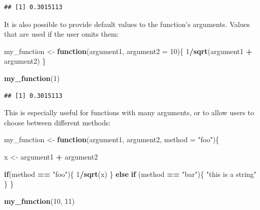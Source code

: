 \documentclass[]{gitbook}
\newenvironment{Shaded}{\begin{snugshade}}{\end{snugshade}}
\newcommand{\ControlFlowTok}[1]{\textcolor[rgb]{0.13,0.29,0.53}{\textbf{#1}}}
\newcommand{\DataTypeTok}[1]{\textcolor[rgb]{0.13,0.29,0.53}{#1}}
\newcommand{\DecValTok}[1]{\textcolor[rgb]{0.00,0.00,0.81}{#1}}
\newcommand{\KeywordTok}[1]{\textcolor[rgb]{0.13,0.29,0.53}{\textbf{#1}}}
\newcommand{\NormalTok}[1]{#1}
\newcommand{\OperatorTok}[1]{\textcolor[rgb]{0.81,0.36,0.00}{\textbf{#1}}}
\newcommand{\StringTok}[1]{\textcolor[rgb]{0.31,0.60,0.02}{#1}}
\begin{document}
\begin{verbatim}
## [1] 0.3015113
\end{verbatim}

It is also possible to provide default values to the function's arguments. Values that are used
if the user omits them:

\begin{Shaded}
\begin{Highlighting}[]
\NormalTok{my_function <-}\StringTok{ }\ControlFlowTok{function}\NormalTok{(argument1, }\DataTypeTok{argument2 =} \DecValTok{10}\NormalTok{)\{}
\DecValTok{1}\OperatorTok{/}\KeywordTok{sqrt}\NormalTok{(argument1 }\OperatorTok{+}\StringTok{ }\NormalTok{argument2)}
\NormalTok{\}}
\end{Highlighting}
\end{Shaded}

\begin{Shaded}
\begin{Highlighting}[]
\KeywordTok{my_function}\NormalTok{(}\DecValTok{1}\NormalTok{)}
\end{Highlighting}
\end{Shaded}

\begin{verbatim}
## [1] 0.3015113
\end{verbatim}

This is especially useful for functions with many arguments, or to allow users to choose between
different methods:

\begin{Shaded}
\begin{Highlighting}[]
\NormalTok{my_function <-}\StringTok{ }\ControlFlowTok{function}\NormalTok{(argument1, argument2, }\DataTypeTok{method =} \StringTok{"foo"}\NormalTok{)\{}
  
\NormalTok{  x <-}\StringTok{ }\NormalTok{argument1 }\OperatorTok{+}\StringTok{ }\NormalTok{argument2}
  
  \ControlFlowTok{if}\NormalTok{(method }\OperatorTok{==}\StringTok{ "foo"}\NormalTok{)\{}
    \DecValTok{1}\OperatorTok{/}\KeywordTok{sqrt}\NormalTok{(x)}
\NormalTok{  \} }\ControlFlowTok{else} \ControlFlowTok{if}\NormalTok{ (method }\OperatorTok{==}\StringTok{ "bar"}\NormalTok{)\{}
    \StringTok{"this is a string"}
\NormalTok{    \}}
\NormalTok{\}}

\KeywordTok{my_function}\NormalTok{(}\DecValTok{10}\NormalTok{, }\DecValTok{11}\NormalTok{)}
\end{Highlighting}
\end{Shaded}
\end{document}
